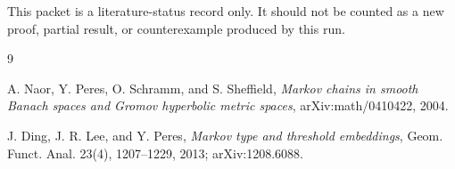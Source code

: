 \documentclass[11pt]{article}
\begin{document}
This packet is a literature-status record only.  It should not be counted as a
new proof, partial result, or counterexample produced by this run.

\begin{thebibliography}{9}

A. Naor, Y. Peres, O. Schramm, and S. Sheffield,
\emph{Markov chains in smooth Banach spaces and Gromov hyperbolic metric
spaces},
arXiv:math/0410422, 2004.

J. Ding, J. R. Lee, and Y. Peres,
\emph{Markov type and threshold embeddings},
Geom. Funct. Anal. 23(4), 1207--1229, 2013;
arXiv:1208.6088.

\end{thebibliography}
\end{document}
